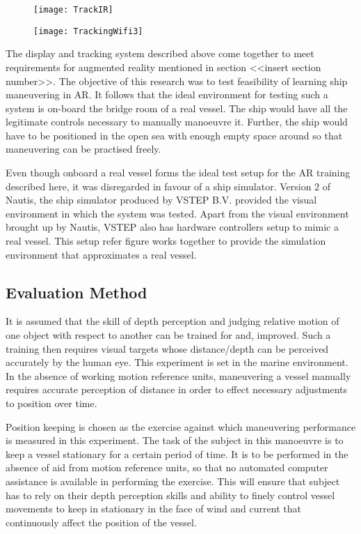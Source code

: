 \begin{figure}[linewidth]
	\centering
	\texttt{[image: TrackIR]}
	\caption{}
	\label{fig:eiffel_marker}
\end{figure}

\begin{figure}[linewidth]
	\centering
	\texttt{[image: TrackingWifi3]}
	\caption{}
	\label{fig:eiffel_marker}
\end{figure}

The display and tracking system described above come together to meet requirements for augmented reality mentioned in section <<insert section number>>. The objective of this research was to test feasibility of learning ship maneuvering in AR. It follows that the ideal environment for testing such a system is on-board the bridge room of a real vessel. The ship would have all the legitimate controls necessary to manually manoeuvre it. Further, the ship would have to be positioned in the open sea with enough empty space around so that maneuvering can be practised freely. 


Even though onboard a real vessel forms the ideal test setup for the AR training described here, it was disregarded in favour of a ship simulator. Version 2 of Nautis, the ship simulator produced by VSTEP B.V. provided the visual environment in which the system was tested. Apart from the visual environment brought up by Nautis, VSTEP also has hardware controllers setup to mimic a real vessel. This setup refer figure works together to provide the simulation environment that approximates a real vessel.

\subsection{Evaluation Method}

It is assumed that the skill of depth perception and judging relative motion of one object with respect to another can be trained for and, improved. Such a training then requires visual targets whose distance/depth can be perceived accurately by the human eye. This experiment is set in the marine environment. In the absence of working motion reference units, maneuvering a vessel manually requires accurate perception of distance in order to effect necessary adjustments to position over time. 


Position keeping is chosen as the exercise against which maneuvering performance is measured in this experiment. The task of the subject in this manoeuvre is to keep a vessel stationary for a certain period of time. It is to be performed in the absence of aid from motion reference units, so that no automated computer assistance is available in performing the exercise. This will ensure that subject has to rely on their depth perception skills and ability to finely control vessel movements to keep in stationary in the face of wind and current that continuously affect the position of the vessel. 


